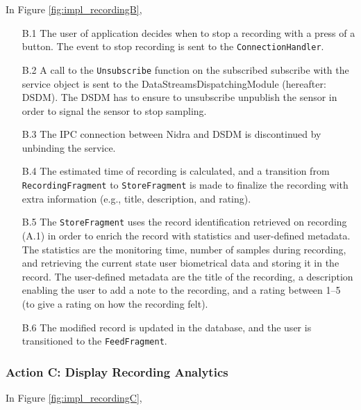 In Figure \ref{fig:impl_recordingB}, 

\begin{itemize}
	\item[B.1] The user of application decides when to stop a recording with a press of a button. The event to stop recording is sent to the \verb|ConnectionHandler|.
	\item[B.2] A call to the \verb|Unsubscribe| function on the subscribed subscribe with the service object is sent to the DataStreamsDispatchingModule (hereafter: DSDM). The DSDM has to ensure to unsubscribe unpublish the sensor in order to signal the sensor to stop sampling. 
	\item[B.3] The IPC connection between Nidra and DSDM is discontinued by unbinding the service. 
	\item[B.4] The estimated time of recording is calculated, and a transition from \verb|RecordingFragment| to \verb|StoreFragment| is made to finalize the recording with extra information (e.g., title, description, and rating). 
	\item[B.5] The \verb|StoreFragment| uses the record identification retrieved on recording (A.1) in order to enrich the record with statistics and user-defined metadata. The statistics are the monitoring time, number of samples during recording, and retrieving the current state user biometrical data and storing it in the record. The user-defined metadata are the title of the recording, a description enabling the user to add a note to the recording, and a rating between 1--5 (to give a rating on how the recording felt). 
	\item[B.6] The modified record is updated in the database, and the user is transitioned to the \verb|FeedFragment|.
\end{itemize}


\subsubsection{Action C: Display Recording Analytics}
In Figure \ref{fig:impl_recordingC}, 

